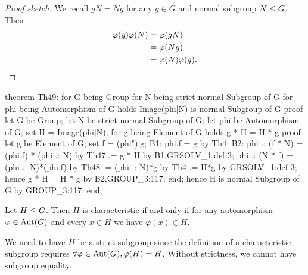 \begin{proof}[Proof sketch]
We recall $gN=Ng$ for any $g\in G$ and normal subgroup $N\trianglelefteq
G$.
Then
\begin{subequations}
  \begin{align}
    \varphi(g)\varphi(N) &= \varphi(gN)\\
    &=\varphi(Ng)\\
    &=\varphi(N)\varphi(g).\qedhere
  \end{align}
\end{subequations}
\end{proof}

\nwenddocs{}\endmoddef\nwstartdeflinemarkup{}\nwenddeflinemarkup
theorem Th49:
  for G being Group
  for N being strict normal Subgroup of G
  for phi being Automorphism of G
  holds Image(phi|N) is normal Subgroup of G
proof
  let G be Group;
  let N be strict normal Subgroup of G;
  let phi be Automorphism of G;
  set H = Image(phi|N);
  for g being Element of G holds g * H = H * g
  proof
    let g be Element of G;
    set f = (phi").g;
    B1: phi.f = g by Th4;
    B2: phi .: (f * N) = (phi.f) * (phi .: N) by Th47
                      .= g * H by B1,GRSOLV_1:def 3;
    phi .: (N * f) = (phi .: N)*(phi.f) by Th48
                  .= (phi .: N)*g by Th4
                  .= H*g by GRSOLV_1:def 3;
    hence g * H = H * g by B2,GROUP_3:117;
  end;
  hence H is normal Subgroup of G by GROUP_3:117;
end;
\eatline
{}\nwendcode{}\nwdocspar
\begin{theorem}
Let $H\leq G$. Then $H$ is characteristic if and only if for any
automorphism $\varphi\in\operatorname{Aut}(G)$ and every $x\in H$ we have
$\varphi(x)\in H$.
\end{theorem}

\begin{thm-remark}
We need to have $H$ be a strict subgroup since the definition of a
characteristic subgroup requires $\forall\varphi\in\operatorname{Aut}(G),\varphi(H)=H$.
Without strictness, we cannot have subgroup equality.
\end{thm-remark}

